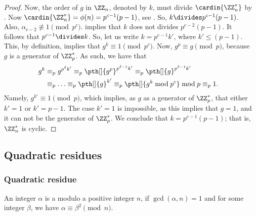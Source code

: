 \begin{proof}
    Now, the order of $g$ in $\ZZ_n$, denoted by $k$, must divide
    $\cardin{\ZZ_n^*}$\newline
    by . Now
    $\cardin{\ZZ_n^*} = \phi(n) = p^{c-1}(p-1)$, see
    .  So, $k \divides
    p^{c-1}(p-1)$. Also,
    $\alpha_{c-2} \nequiv 1 \pmod{p^{c}}$.
    implies that $k$ does not divides $p^{c-2}(p-1)$.  It follows that
    $p^{c-1} \divides k$. So, let us write $k = p^{c-1} k'$, where $k'
    \leq (p-1)$. This, by definition, implies that $g^{k} \equiv 1
    \pmod{p^c}$. Now, $g^p \equiv g \pmod{p}$, because $g$ is a
    generator of $\ZZ_p^*$. As such, we have that
    \begin{align*}
        g^{k}%
        &\equiv_p%
        g^{p^\delta k'} %
        \equiv_p%
        \pth[]{g^p}^{p^{\delta-1} k'} \equiv_p%
        \pth[]{g}^{p^{\delta-1} k'} \\
        &\equiv_p \ldots \equiv_p%
        \pth[]{g}^{k'} \equiv_p \pth[]{g^k \bmod{p^c}} \bmod{p}
        \equiv_p %
        1.
    \end{align*}
    Namely, $g^{k'} \equiv 1 \pmod{p}$, which implies, as $g$ as a
    generator of $\ZZ_p^*$, that either $k'=1$ or $k'=p-1$. The case
    $k'=1$ is impossible, as this implies that $g =1$, and it can not
    be the generator of $\ZZ_p^*$. We conclude that $k =
    p^{c-1}(p-1)$; that is, $\ZZ_n^*$ is cyclic.
\end{proof}

\subsection{Quadratic residues}
\subsubsection{Quadratic residue}

\begin{defn}
    An integer $\alpha$ is a  modulo a
    positive integer $n$, if $\gcd(\alpha, n)=1$ and for some integer
    $\beta$, we have $\alpha \equiv \beta^2 \pmod {n}$.
\end{defn}


